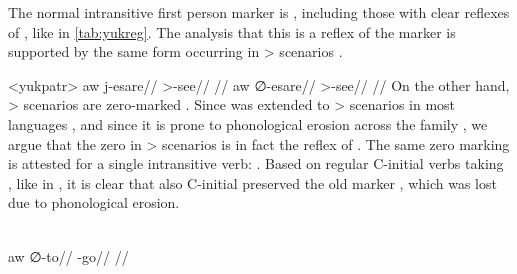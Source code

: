 

The normal intransitive first person marker is , including those with clear reflexes of \detrz, like   in \cref{tab:yukreg}.
The analysis that this is a reflex of the  marker  is supported by the same form occurring in > scenarios .

\pex<yukpatr>\yukpa \parencite[][139]{meira2006syntactic}
\begingl
\gla aw j-esare//
\glb {} >-see//
\glft {}//
\endgl
{}
\begingl
\gla aw {\normalfont ∅}-esare//
\glb {} >-see//
\glft {}//
\endgl
\xe
On the other hand, > scenarios are zero-marked .
Since \PC {}  was extended to > scenarios in most languages \parencite[81--82]{gildea1998}, and since it is prone to phonological erosion across the family , we argue that the zero in > scenarios is in fact the \yukpa reflex of .
The same zero marking is attested for a single intransitive verb:   .
Based on regular C-initial verbs taking , like  in , it is clear that also C-initial   preserved the old  marker , which was lost due to phonological erosion.

\yukpa \parencite[][139]{meira2006syntactic}\\
\begingl
\gla aw {\normalfont ∅}-to//
\glb {} -go//
\glft {}//
\endgl
\xe